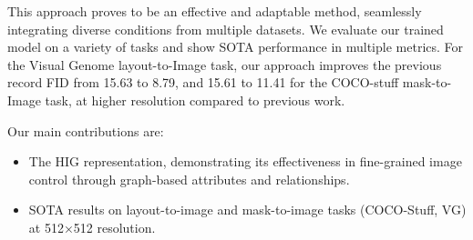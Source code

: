 
This approach proves to be an effective and adaptable method, seamlessly integrating diverse conditions from multiple datasets. We evaluate our trained model on a variety of tasks and show SOTA performance in multiple metrics. For the Visual Genome layout-to-Image task, our approach improves the previous record FID from 15.63 to 8.79, and  15.61 to 11.41 for the COCO-stuff mask-to-Image task, at higher resolution compared to previous work.

Our main contributions are:

\vspace{-4mm} 
\begin{itemize}
    \item The HIG representation, demonstrating its effectiveness in fine-grained image control through graph-based attributes and relationships. 
    \item SOTA results on layout-to-image and mask-to-image tasks (COCO-Stuff, VG) at 512×512 resolution.
\end{itemize}
